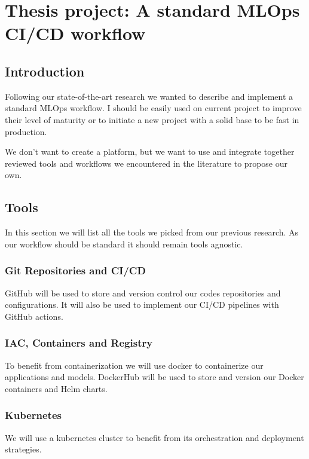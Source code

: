 \chapter{Thesis project: A standard MLOps CI/CD workflow}\label{ch:thesis-project:-a-standard-mlops-ci/cd-workflow}
\section{Introduction}\label{sec:introduction}
Following our state-of-the-art research we wanted to describe and implement a standard MLOps workflow.
I should be easily used on current project to improve their level of maturity or to initiate a new project with a solid
base to be fast in production.

We don't want to create a platform, but we want to use and integrate together reviewed
tools and workflows we encountered in the literature to propose our own.

\section{Tools}\label{sec:tools2}
In this section we will list all the tools we picked from our previous research.
As our workflow should be standard it should remain tools agnostic.

\subsection{Git Repositories and CI/CD}\label{subsec:github}
GitHub will be used to store and version control our codes repositories and configurations.
It will also be used to implement our CI/CD pipelines with GitHub actions.

\subsection{IAC, Containers and Registry}\label{subsec:dockerhub}
To benefit from containerization we will use docker to containerize our applications and models.
DockerHub will be used to store and version our Docker containers and Helm charts.

\subsection{Kubernetes}\label{subsec:kubernetes}
We will use a kubernetes cluster to benefit from its orchestration and deployment strategies.

